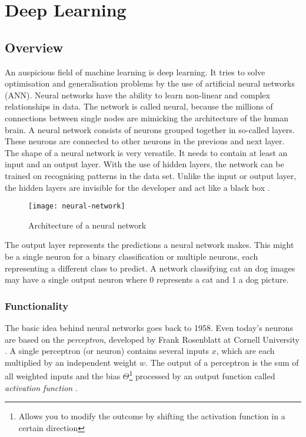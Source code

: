 \chapter{Deep Learning}

\section{Overview}

An auspicious field of machine learning is deep learning. It tries to solve optimisation and generalisation problems by the use of artificial neural networks (ANN). Neural networks have the ability to learn non-linear and complex relationships in data. The network is called neural, because the millions of connections between single nodes are mimicking the architecture of the human brain. A neural network consists of neurons grouped together in so-called layers. These neurons are connected to other neurons in the previous and next layer. The shape of a neural network is very versatile. It needs to contain at least an input and an output layer. With the use of hidden layers, the network can be trained on recognising patterns in the data set. Unlike the input or output layer, the hidden layers are invisible for the developer and act like a black box \cite{nn}.

\begin{figure}[!ht]
    \centering
    \texttt{[image: neural-network]}
    \caption{Architecture of a neural network}
    \label{fig:nn}
\end{figure}

The output layer represents the predictions a neural network makes. This might be a single neuron for a binary classification or multiple neurons, each representing a different class to predict. A network classifying cat an dog images may have a single output neuron where $0$ represents a cat and $1$ a dog picture.

\subsection{Functionality}

The basic idea behind neural networks goes back to 1958. Even today's neurons are based on the \emph{perceptron}, developed by Frank Rosenblatt at Cornell University \cite{wiki06}. A single perceptron (or neuron) contains several inputs $x$, which are each multiplied by an independent weight $w$. The output of a perceptron is the sum of all weighted inputs and the bias $\Theta$\footnote{Allows you to modify the outcome by shifting the activation function in a certain direction} processed by an output function called \emph{activation function} \cite{perc17}.

